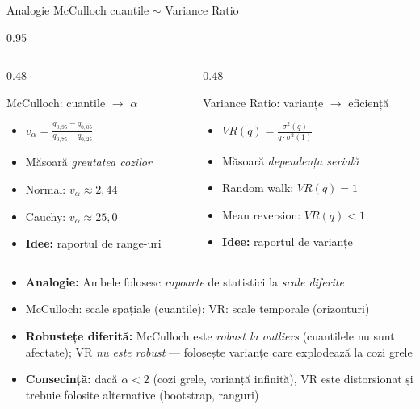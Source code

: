 \documentclass[9pt, aspectratio=169, t]{beamer}
\begin{document}
\begin{frame}[shrink=15]{Analogie McCulloch cuantile $\sim$ Variance Ratio}
\begin{cminipage}{0.95\textwidth}
\begin{columns}[T]
\begin{column}{0.48\textwidth}
\begin{block}{McCulloch: cuantile $\to$ $\alpha$}
\begin{itemize}\setlength{\itemsep}{0pt}
    \item $v_\alpha = \frac{q_{0{,}95} - q_{0{,}05}}{q_{0{,}75} - q_{0{,}25}}$
    \item Măsoară \textit{greutatea cozilor}
    \item Normal: $v_\alpha \approx 2{,}44$
    \item Cauchy: $v_\alpha \approx 25{,}0$
    \item \textbf{Idee:} raportul de range-uri
\end{itemize}
\end{block}
\end{column}
\begin{column}{0.48\textwidth}
\begin{block}{Variance Ratio: varianțe $\to$ eficiență}
\begin{itemize}\setlength{\itemsep}{0pt}
    \item $VR(q) = \frac{\sigma^2(q)}{q \cdot \sigma^2(1)}$
    \item Măsoară \textit{dependența serială}
    \item Random walk: $VR(q) = 1$
    \item Mean reversion: $VR(q) < 1$
    \item \textbf{Idee:} raportul de varianțe
\end{itemize}
\end{block}
\end{column}
\end{columns}

\vspace{0.3cm}
\begin{itemize}\setlength{\itemsep}{0pt}
    \item \textbf{Analogie:} Ambele folosesc \textit{rapoarte} de statistici la \textit{scale diferite}
    \item McCulloch: scale spațiale (cuantile); VR: scale temporale (orizonturi)
    \item \textbf{Robustețe diferită:} McCulloch este \emph{robust la outliers} (cuantilele nu sunt afectate); VR \emph{nu este robust} --- folosește varianțe care explodează la cozi grele
    \item \textbf{Consecință:} dacă $\alpha < 2$ (cozi grele, varianță infinită), VR este distorsionat și trebuie folosite alternative (bootstrap, ranguri)
\end{itemize}
\end{cminipage}
\end{frame}
\end{document}
